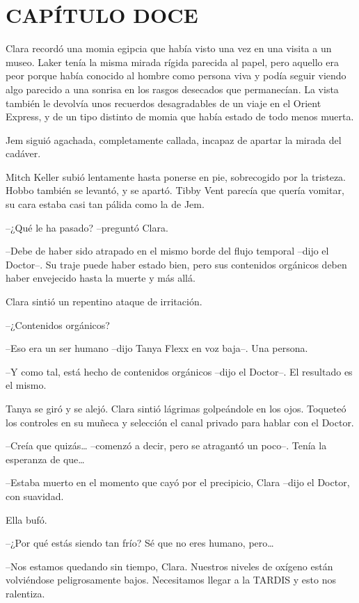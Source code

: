 \chapter*{CAPÍTULO DOCE}

{Clara recordó una momia egipcia que había visto una vez en una visita a
 un museo. Laker tenía la misma mirada rígida parecida al papel, pero
 aquello era peor porque había conocido al hombre como persona viva y
 podía seguir viendo algo parecido a una sonrisa en los rasgos desecados
 que permanecían. La vista también le devolvía unos recuerdos
 desagradables de un viaje en el Orient Express, y de un tipo distinto de
momia que había estado de todo menos muerta.}

{Jem siguió agachada, completamente callada, incapaz de apartar la mirada
del cadáver.}

{Mitch Keller subió lentamente hasta ponerse en pie, sobrecogido por la
 tristeza. Hobbo también se levantó, y se apartó. Tibby Vent parecía que
quería vomitar, su cara estaba casi tan pálida como la de Jem.}

{--¿Qué le ha pasado? --preguntó Clara.}

{--Debe de haber sido atrapado en el mismo borde del flujo temporal
 --dijo el Doctor--. Su traje puede haber estado bien, pero sus
 contenidos orgánicos deben haber envejecido hasta la muerte y más
allá.}

{Clara sintió un repentino ataque de irritación.}

{--¿Contenidos orgánicos?}

{--Eso era un ser humano --dijo Tanya Flexx en voz baja--. Una persona.}

{--Y como tal, está hecho de contenidos orgánicos --dijo el Doctor--. El
resultado es el mismo.}

{Tanya se giró y se alejó. Clara sintió lágrimas golpeándole en los ojos.
 Toqueteó los controles en su muñeca y selección el canal privado para
hablar con el Doctor.}

{--Creía que quizás\ldots{} --comenzó a decir, pero se atragantó un
 poco--. Tenía la esperanza de que\ldots{}}

{--Estaba muerto en el momento que cayó por el precipicio, Clara --dijo
el Doctor, con suavidad.}

{Ella bufó.}

{--¿Por qué estás siendo tan frío? Sé que no eres humano, pero\ldots{}}

{--Nos estamos quedando sin tiempo, Clara. Nuestros niveles de oxígeno
 están volviéndose peligrosamente bajos. Necesitamos llegar a la TARDIS y
esto nos ralentiza.}

